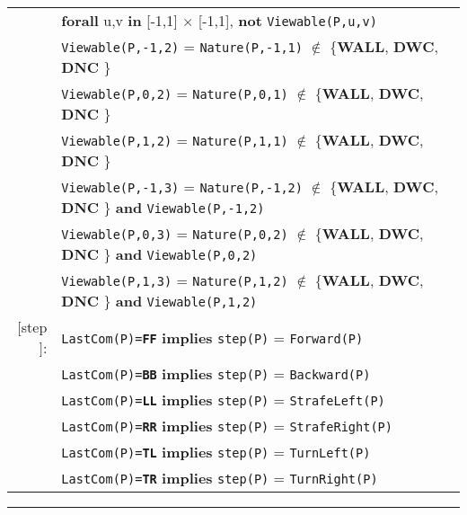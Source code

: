 \documentclass{article}
\begin{document}
\begin{tabular}{rl}
& \textbf{forall} u,v \textbf{in} [-1,1] $\times$ [-1,1], \textbf{not} \texttt{Viewable(P,u,v)} \\
& \texttt{Viewable(P,-1,2)} = \texttt{Nature(P,-1,1)} $\notin$ \{\textbf{WALL}, \textbf{DWC}, \textbf{DNC} \}  \\
& \texttt{Viewable(P,0,2)} = \texttt{Nature(P,0,1)} $\notin$ \{\textbf{WALL}, \textbf{DWC}, \textbf{DNC} \}  \\
& \texttt{Viewable(P,1,2)} = \texttt{Nature(P,1,1)} $\notin$ \{\textbf{WALL}, \textbf{DWC}, \textbf{DNC} \}  \\
& \texttt{Viewable(P,-1,3)} = \texttt{Nature(P,-1,2)} $\notin$ \{\textbf{WALL}, \textbf{DWC}, \textbf{DNC} \} \textbf{and} \texttt{Viewable(P,-1,2)} \\
& \texttt{Viewable(P,0,3)} = \texttt{Nature(P,0,2)} $\notin$ \{\textbf{WALL}, \textbf{DWC}, \textbf{DNC} \} \textbf{and} \texttt{Viewable(P,0,2)} \\
& \texttt{Viewable(P,1,3)} = \texttt{Nature(P,1,2)} $\notin$ \{\textbf{WALL}, \textbf{DWC}, \textbf{DNC} \} \textbf{and} \texttt{Viewable(P,1,2)} \\
$[$step$]$: & \texttt{LastCom(P)=\textbf{FF}} \textbf{implies} \texttt{step(P)} = \texttt{Forward(P)} \\
& \texttt{LastCom(P)=\textbf{BB}} \textbf{implies} \texttt{step(P)} = \texttt{Backward(P)} \\
& \texttt{LastCom(P)=\textbf{LL}} \textbf{implies} \texttt{step(P)} = \texttt{StrafeLeft(P)} \\
& \texttt{LastCom(P)=\textbf{RR}} \textbf{implies} \texttt{step(P)} = \texttt{StrafeRight(P)} \\
& \texttt{LastCom(P)=\textbf{TL}} \textbf{implies} \texttt{step(P)} = \texttt{TurnLeft(P)} \\
& \texttt{LastCom(P)=\textbf{TR}} \textbf{implies} \texttt{step(P)} = \texttt{TurnRight(P)} \\
\end{tabular}

\vspace{5mm}\hrule\vspace{5mm}
\end{document}
